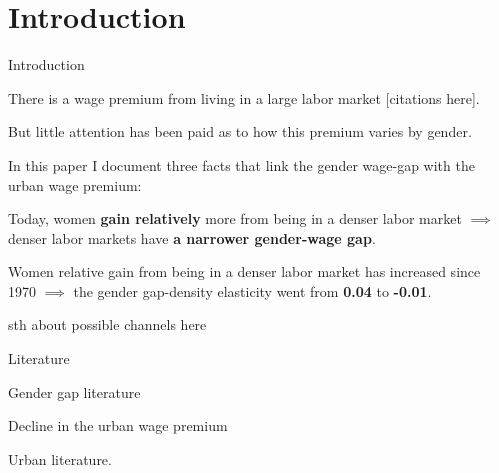 \section{Introduction}


\begin{frame}{Introduction}
	\bitem
		\item There is a wage premium from living in a large labor market [citations here].
		\item But little attention has been paid as to how this premium varies by gender.

	In this paper I document three facts that link the gender wage-gap with the urban wage premium:
	\benu
	\item Today, women \textbf{\alert{gain relatively}} more from being in a denser labor market $\implies$ denser labor markets have \alert{\textbf{a narrower gender-wage gap}}.
	\item Women relative gain from being in a denser labor market has increased since 1970 $\implies$ the gender gap-density elasticity went from \textbf{\alert{0.04}} to \textbf{\alert{-0.01}}. 
	\item sth about possible channels here
	\eenu
	\eitem
\end{frame}



\begin{frame}{Literature}
	\bitem
		\item Gender gap literature
		\item Decline in the urban wage premium
		\item Urban literature.
	\eitem 
	
\end{frame}
